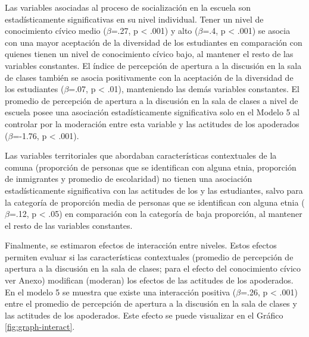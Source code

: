 \documentclass[12pt,twoside]{templates/facsothesis}
\begin{document}
Las variables asociadas al proceso de socialización en la escuela son estadísticamente significativas en su nivel individual. Tener un nivel de conocimiento cívico medio (\(\beta\)=.27, p \textless{} .001) y alto (\(\beta\)=.4, p \textless{} .001) se asocia con una mayor aceptación de la diversidad de los estudiantes en comparación con quienes tienen un nivel de conocimiento cívico bajo, al mantener el resto de las variables constantes. El índice de percepción de apertura a la discusión en la sala de clases también se asocia positivamente con la aceptación de la diversidad de los estudiantes (\(\beta\)=.07, p \textless{} .01), manteniendo las demás variables constantes. El promedio de percepción de apertura a la discusión en la sala de clases a nivel de escuela posee una asociación estadísticamente significativa solo en el Modelo 5 al controlar por la moderación entre esta variable y las actitudes de los apoderados (\(\beta\)=-1.76, p \textless{} .001).

Las variables territoriales que abordaban características contextuales de la comuna (proporción de personas que se identifican con alguna etnia, proporción de inmigrantes y promedio de escolaridad) no tienen una asociación estadísticamente significativa con las actitudes de los y las estudiantes, salvo para la categoría de proporción media de personas que se identifican con alguna etnia (\(\beta\)=.12, p \textless{} .05) en comparación con la categoría de baja proporción, al mantener el resto de las variables constantes.

Finalmente, se estimaron efectos de interacción entre niveles. Estos efectos permiten evaluar si las características contextuales (promedio de percepción de apertura a la discusión en la sala de clases; para el efecto del conocimiento cívico ver Anexo) modifican (moderan) los efectos de las actitudes de los apoderados. En el modelo 5 se muestra que existe una interacción positiva (\(\beta\)=.26, p \textless{} .001) entre el promedio de percepción de apertura a la discusión en la sala de clases y las actitudes de los apoderados. Este efecto se puede visualizar en el Gráfico \ref{fig:graph-interact}.
\end{document}
